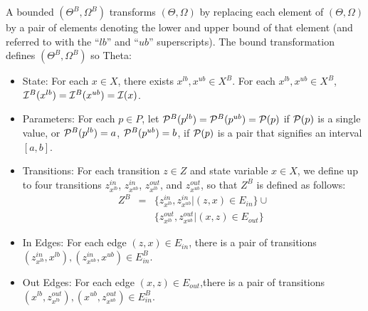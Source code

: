 \begin{definition}
    A bounded \Petrinet{} $(\Theta^B, \Omega^B)$ transforms \Petrinet{} $(\Theta,
    \Omega)$ by replacing each element of $(\Theta, \Omega)$ by
    a pair of elements denoting the lower and upper bound of that element (and
    referred to with the ``$lb$'' and ``$ub$'' superscripts).  The bound transformation defines $(\Theta^B, \Omega^B)$ so Theta:
    \begin{itemize}
        \item State: For each $x \in X$,  there exists $x^{lb}, x^{ub} \in X^B$.   For each $x^{lb}, x^{ub} \in X^B$, ${\cal
        I}^B(x^{lb}) = {\cal I}^B(x^{ub}) = {\cal I}(x)$.
            \item Parameters: For each $p \in P$, let ${\cal P}^B(p^{lb}) = {\cal P}^B(p^{ub}) = {\cal P}(p)$ if ${\cal P}(p)$ is a single value, or  ${\cal P}^B(p^{lb}) = a$, ${\cal P}^B(p^{ub}) = b$, if ${\cal P}(p)$ is a pair that signifies an interval $[a, b]$. 
            \item Transitions: For each transition $z \in Z$ and state variable $x\in X$, we define up to four transitions $z^{in}_{x^{lb}}$, $z^{in}_{x^{ub}}$, $z^{out}_{x^{lb}}$, and $z^{out}_{x^{ub}}$, so that $Z^B$ is defined as follows:
            \begin{eqnarray*}
                Z^B &=& \{z^{in}_{x^{lb}}, z^{in}_{x^{ub}} | (z, x) \in E_{in} \}\cup\\ 
                &&\{z^{out}_{x^{lb}}, z^{out}_{x^{ub}} | (x,z) \in E_{out} \}
            \end{eqnarray*}
            
            \item In Edges: For each edge $(z, x) \in E_{in}$, there is a pair of transitions $(z^{in}_{x^{lb}}, x^{lb} ), (z^{in}_{x^{ub}}, x^{ub}) \in E^B_{in}$.
            \item Out Edges: For each edge $(x, z) \in E_{out}$,there is a pair of transitions $(x^{lb}, z^{out}_{x^{lb}}), (x^{ub}, z^{out}_{x^{ub}}) \in E^B_{in}$.
    

\end{itemize}
\end{definition}
